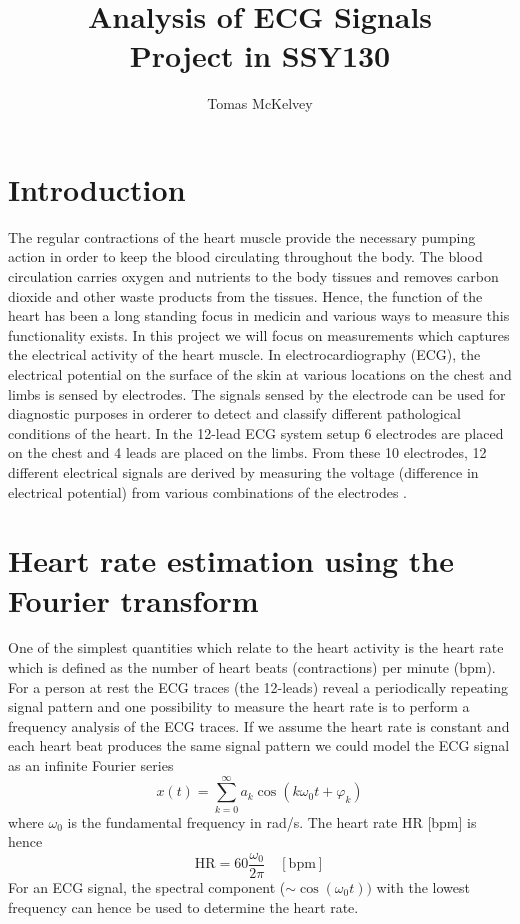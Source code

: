 \documentclass[12pt]{article}
\begin{document}
\title{Analysis of ECG Signals \\ Project in SSY130 }
\author{Tomas McKelvey}

\maketitle{}
\section{Introduction}
\label{sec:introduction}
The regular contractions of the heart muscle provide the necessary pumping action in order to keep the blood circulating throughout the body. The blood circulation carries oxygen and nutrients to the body tissues and removes carbon dioxide and other waste products from the tissues.
Hence, the function of the heart has been a long standing focus in medicin and various ways to measure this functionality exists. In this project we will focus on measurements which captures the electrical activity of the heart muscle. In electrocardiography (ECG), the electrical potential on the surface of the skin at various locations on the chest and limbs is sensed by electrodes. The signals sensed by the electrode can be used for diagnostic purposes in orderer to detect and classify different pathological conditions of the heart. In the 12-lead ECG system setup 6 electrodes are placed on the chest and 4 leads are placed on the limbs. From these 10 electrodes, 12 different electrical signals are derived by measuring the voltage (difference in electrical potential) from various combinations of the electrodes \cite{cablesandsensors12LeadECGPlacement}.    

\section{Heart rate estimation using the Fourier transform}
One of the simplest quantities which relate to the heart activity is the heart rate which is defined as the number of heart beats (contractions) per minute (bpm). For a person at rest the ECG traces (the 12-leads) reveal a periodically repeating signal pattern and one possibility to measure the heart rate is to perform a frequency analysis of the ECG traces. If we assume the heart rate is constant and each heart beat produces the same signal pattern we could model the ECG signal as an infinite Fourier series
\begin{equation}
  \label{eq:1}
   x(t) = \sum_{k=0}^{\infty} a_k  \cos( k \omega_0 t + \varphi_k)
\end{equation}
where $\omega_0$ is the fundamental frequency in rad/s. The heart rate $\mathrm{HR}$ [bpm] is hence
\begin{equation}
  \label{eq:2}
  \mathrm{HR} = 60 \frac{\omega_0}{2\pi} \quad [\text{bpm}]
\end{equation}
For an ECG signal, the spectral component ($\sim \cos(\omega_0t) )$ with the lowest frequency can hence be used to determine the heart rate.
\end{document}
